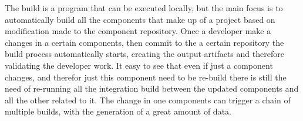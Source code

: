 \documentclass[../main.tex]{subfiles}
\begin{document}
The build is a program that can be executed locally, but the main focus is to automatically build all the components that make up of a project based on modification made to the component repository. Once a developer make a changes in a certain components, then commit to the a certain repository the build process automatically starts, creating the output artifacts and therefore validating the developer work. It easy to see that even if just a component changes, and therefor just this component need to be re-build there is still the need of re-running all the integration build between the updated components and all the other related to it. The change in one components can trigger a chain of multiple builds, with the generation of a great amount of data.
\cleardoublepage
\end{document}
